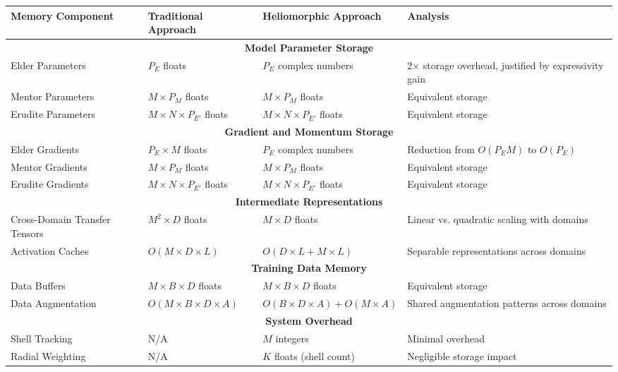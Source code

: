 \begin{table}[h]
\centering
\begin{tabular}{|p{3.5cm}|p{3.5cm}|p{3.5cm}|p{3.5cm}|}
\hline
\textbf{Memory Component} & \textbf{Traditional Approach} & \textbf{Heliomorphic Approach} & \textbf{Analysis} \\
\hline
\multicolumn{4}{|c|}{\textbf{Model Parameter Storage}} \\
\hline
Elder Parameters & $P_E$ floats & $P_E$ complex numbers & 2× storage overhead, justified by expressivity gain \\
\hline
Mentor Parameters & $M \times P_M$ floats & $M \times P_M$ floats & Equivalent storage \\
\hline
Erudite Parameters & $M \times N \times P_{E'}$ floats & $M \times N \times P_{E'}$ floats & Equivalent storage \\
\hline
\multicolumn{4}{|c|}{\textbf{Gradient and Momentum Storage}} \\
\hline
Elder Gradients & $P_E \times M$ floats & $P_E$ complex numbers & Reduction from $O(P_E M)$ to $O(P_E)$ \\
\hline
Mentor Gradients & $M \times P_M$ floats & $M \times P_M$ floats & Equivalent storage \\
\hline
Erudite Gradients & $M \times N \times P_{E'}$ floats & $M \times N \times P_{E'}$ floats & Equivalent storage \\
\hline
\multicolumn{4}{|c|}{\textbf{Intermediate Representations}} \\
\hline
Cross-Domain Transfer Tensors & $M^2 \times D$ floats & $M \times D$ floats & Linear vs. quadratic scaling with domains \\
\hline
Activation Caches & $O(M \times D \times L)$ & $O(D \times L + M \times L)$ & Separable representations across domains \\
\hline
\multicolumn{4}{|c|}{\textbf{Training Data Memory}} \\
\hline
Data Buffers & $M \times B \times D$ floats & $M \times B \times D$ floats & Equivalent storage \\
\hline
Data Augmentation & $O(M \times B \times D \times A)$ & $O(B \times D \times A) + O(M \times A)$ & Shared augmentation patterns across domains \\
\hline
\multicolumn{4}{|c|}{\textbf{System Overhead}} \\
\hline
Shell Tracking & N/A & $M$ integers & Minimal overhead \\
\hline
Radial Weighting & N/A & $K$ floats (shell count) & Negligible storage impact \\

\end{tabular}
\end{table}
